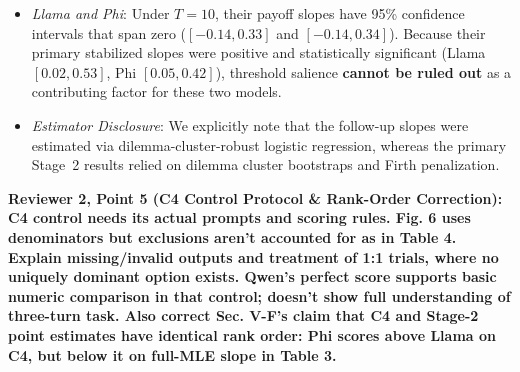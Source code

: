 \documentclass[11pt]{article}
\newcommand{\reviewercomment}[1]{\vspace{1em}\noindent\textbf{\textcolor{commentcolor}{#1}}}
\begin{document}
\begin{itemize}[leftmargin=*]
\begin{itemize}
  \item \textit{Llama and Phi}: Under $T=10$, their payoff slopes have 95\% confidence intervals that span zero ($[-0.14, 0.33]$ and $[-0.14, 0.34]$). Because their primary stabilized slopes were positive and statistically significant (Llama $[0.02, 0.53]$, Phi $[0.05, 0.42]$), threshold salience \textbf{cannot be ruled out} as a contributing factor for these two models.
  \item \textit{Estimator Disclosure}: We explicitly note that the follow-up slopes were estimated via dilemma-cluster-robust logistic regression, whereas the primary Stage~2 results relied on dilemma cluster bootstraps and Firth penalization.
  \end{itemize}
\end{itemize}

\reviewercomment{Reviewer 2, Point 5 (C4 Control Protocol \& Rank-Order Correction): C4 control needs its actual prompts and scoring rules. Fig. 6 uses denominators but exclusions aren't accounted for as in Table 4. Explain missing/invalid outputs and treatment of 1:1 trials, where no uniquely dominant option exists. Qwen's perfect score supports basic numeric comparison in that control; doesn't show full understanding of three-turn task. Also correct Sec. V-F's claim that C4 and Stage-2 point estimates have identical rank order: Phi scores above Llama on C4, but below it on full-MLE slope in Table 3.}
\end{document}
